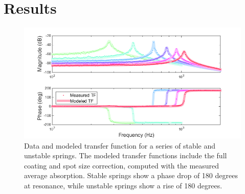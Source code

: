 




\section{Results}
\label{sec:res}

\begin{figure}[thb]%
\centering
\includegraphics[width=.7\paperwidth]{figures/photothermal/newOSfit.png}%
\caption[Stable and unstable optical springs]{Data and modeled transfer function for a series of stable and unstable springs. The modeled transfer functions include the full coating and spot size correction, computed with the measured average absorption. Stable springs show a phase drop of 180 degrees at resonance, while unstable springs show a rise of 180 degrees.}%
\label{fig:springs}%
\end{figure}

